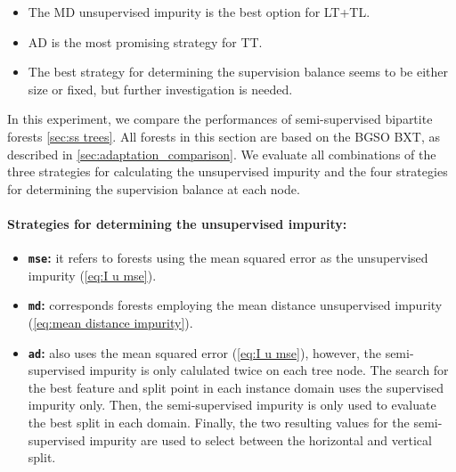 \begin{mdframed}[frametitle={Key findings}]
    \begin{itemize}
        \item The MD unsupervised impurity is the best option for LT+TL.
        \item AD is the most promising strategy for TT.
        \item The best strategy for determining the supervision balance seems to be either size or fixed, but further investigation is needed.
    \end{itemize}
\end{mdframed}

In this experiment, we compare the performances of semi-supervised bipartite forests \autoref{sec:ss trees}. All forests in this section are based on the BGSO BXT, as described in \autoref{sec:adaptation_comparison}. We evaluate all combinations of the three strategies for calculating the unsupervised impurity and the four strategies for determining the supervision balance at each node.

\paragraph*{Strategies for determining the unsupervised impurity:}
\begin{itemize}
    \item \textbf{\texttt{mse}:} it refers to forests using the mean squared error as the unsupervised impurity (\autoref{eq:I u mse}).
    \item \textbf{\texttt{md}:} corresponds forests employing the mean distance unsupervised impurity (\autoref{eq:mean distance impurity}).
    \item \textbf{\texttt{ad}:} also uses the mean squared error (\autoref{eq:I u mse}), however, the semi-supervised impurity is only calulated twice on each tree node. The search for the best feature and split point in each instance domain uses the supervised impurity only. Then, the semi-supervised impurity is only used to evaluate the best split in each domain. Finally, the two resulting values for the semi-supervised impurity are used to select between the horizontal and vertical split.
\end{itemize}

